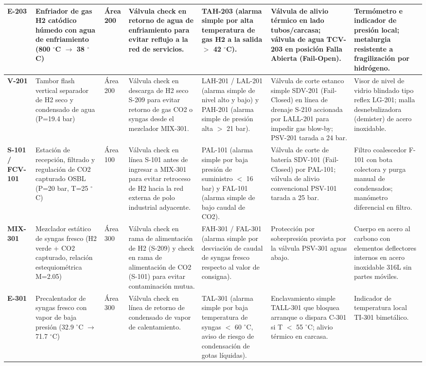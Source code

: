 \documentclass[10pt,letterpaper]{article}
\begin{document}
\begin{landscape}
\begin{xltabular}{\linewidth}{|l|p{2.8cm}|p{1.2cm}|>{\raggedright\arraybackslash}X|>{\raggedright\arraybackslash}X|>{\raggedright\arraybackslash}X|p{2.8cm}|}
\textbf{E-203} & Enfriador de gas H2 catódico húmedo con agua de enfriamiento (800 $^\circ$C $\to$ 38 $^\circ$C) & Área 200 & Válvula check en retorno de agua de enfriamiento para evitar reflujo a la red de servicios. & TAH-203 (alarma simple por alta temperatura de gas H2 a la salida $>$ 42 $^\circ$C). & Válvula de alivio térmico en lado tubos/carcasa; válvula de agua TCV-203 en posición Falla Abierta (Fail-Open). & Termómetro e indicador de presión local; metalurgia resistente a fragilización por hidrógeno. \\ \hline
\textbf{V-201} & Tambor flash vertical separador de H2 seco y condensado de agua (P=19.4 bar) & Área 200 & Válvula check en descarga de H2 seco S-209 para evitar retorno de gas CO2 o syngas desde el mezclador MIX-301. & LAH-201 / LAL-201 (alarma simple de nivel alto y bajo) y PAH-201 (alarma simple de presión alta $>$ 21 bar). & Válvula de corte estanco simple SDV-201 (Fail-Closed) en línea de drenaje S-210 accionada por LALL-201 para impedir gas blow-by; PSV-201 tarada a 24 bar. & Visor de nivel de vidrio blindado tipo reflex LG-201; malla desnebulizadora (demister) de acero inoxidable. \\ \hline
\textbf{S-101 / FCV-101} & Estación de recepción, filtrado y regulación de CO2 capturado OSBL (P=20 bar, T=25 $^\circ$C) & Área 100 & Válvula check en línea S-101 antes de ingresar a MIX-301 para evitar retroceso de H2 hacia la red externa de polo industrial adyacente. & PAL-101 (alarma simple por baja presión de suministro $<$ 16 bar) y FAL-101 (alarma simple de bajo caudal de CO2). & Válvula de corte de batería SDV-101 (Fail-Closed) por PAL-101; válvula de alivio convencional PSV-101 tarada a 25 bar. & Filtro coalescedor F-101 con bota colectora y purga manual de condensados; manómetro diferencial en filtro. \\ \hline
\textbf{MIX-301} & Mezclador estático de syngas fresco (H2 verde + CO2 capturado, relación estequiométrica M=2.05) & Área 300 & Válvula check en rama de alimentación de H2 (S-209) y check en rama de alimentación de CO2 (S-101) para evitar contaminación mutua. & FAH-301 / FAL-301 (alarma simple por desviación de caudal de syngas fresco respecto al valor de consigna). & Protección por sobrepresión provista por la válvula PSV-301 aguas abajo. & Cuerpo en acero al carbono con elementos deflectores internos en acero inoxidable 316L sin partes móviles. \\ \hline
\textbf{E-301} & Precalentador de syngas fresco con vapor de baja presión (32.9 $^\circ$C $\to$ 71.7 $^\circ$C) & Área 300 & Válvula check en línea de retorno de condensado de vapor de calentamiento. & TAL-301 (alarma simple por baja temperatura de syngas $<$ 60 $^\circ$C, aviso de riesgo de condensación de gotas líquidas). & Enclavamiento simple TALL-301 que bloquea arranque o dispara C-301 si T $<$ 55 $^\circ$C; alivio térmico en carcasa. & Indicador de temperatura local TI-301 bimetálico. \\ \hline

\end{xltabular}
\end{landscape}
\end{document}
